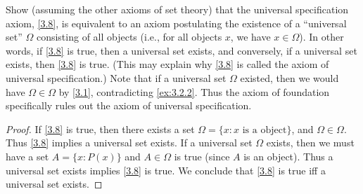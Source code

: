 \begin{ex}\label{ex:3.2.3}
  Show (assuming the other axioms of set theory) that the universal specification axiom, \cref{3.8}, is equivalent to an axiom postulating the existence of a ``universal set'' \(\Omega\) consisting of all objects (i.e., for all objects \(x\), we have \(x \in \Omega\)).
  In other words, if \cref{3.8} is true, then a universal set exists, and conversely, if a universal set exists, then \cref{3.8} is true.
  (This may explain why \cref{3.8} is called the axiom of universal specification.)
  Note that if a universal set \(\Omega\) existed, then we would have \(\Omega \in \Omega\) by \cref{3.1}, contradicting \cref{ex:3.2.2}.
  Thus the axiom of foundation specifically rules out the axiom of universal specification.
\end{ex}

\begin{proof}
  If \cref{3.8} is true, then there exists a set \(\Omega = \{x: x \text{ is a object}\}\), and \(\Omega \in \Omega\).
  Thus \cref{3.8} implies a universal set exists.
  If a universal set \(\Omega\) exists, then we must have a set \(A = \{x: P(x)\}\) and \(A \in \Omega\) is true (since \(A\) is an object).
  Thus a universal set exists implies \cref{3.8} is true.
  We conclude that \cref{3.8} is true iff a universal set exists.
\end{proof}